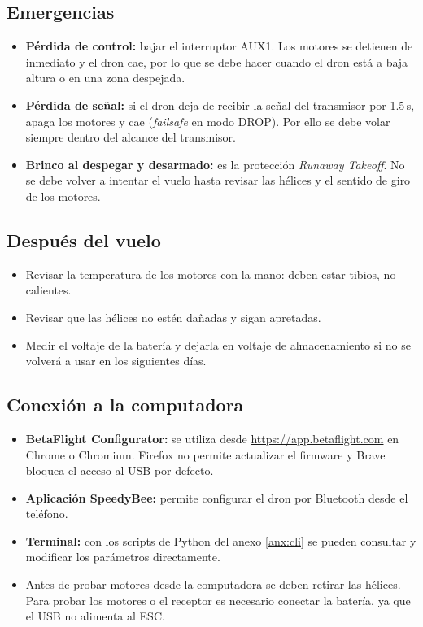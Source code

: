 \documentclass[11pt,letterpaper]{article}
\begin{document}
\subsection{Emergencias}
\begin{itemize}[nosep]
    \item \textbf{Pérdida de control:} bajar el interruptor AUX1. Los motores se detienen de inmediato y el dron cae, por lo que se debe hacer cuando el dron está a baja altura o en una zona despejada.
    \item \textbf{Pérdida de señal:} si el dron deja de recibir la señal del transmisor por 1.5\,s, apaga los motores y cae (\textit{failsafe} en modo DROP). Por ello se debe volar siempre dentro del alcance del transmisor.
    \item \textbf{Brinco al despegar y desarmado:} es la protección \textit{Runaway Takeoff}. No se debe volver a intentar el vuelo hasta revisar las hélices y el sentido de giro de los motores.
\end{itemize}

\subsection{Después del vuelo}
\begin{itemize}[nosep]
    \item Revisar la temperatura de los motores con la mano: deben estar tibios, no calientes.
    \item Revisar que las hélices no estén dañadas y sigan apretadas.
    \item Medir el voltaje de la batería y dejarla en voltaje de almacenamiento si no se volverá a usar en los siguientes días.
\end{itemize}

\subsection{Conexión a la computadora}
\begin{itemize}[nosep]
    \item \textbf{BetaFlight Configurator:} se utiliza desde \url{https://app.betaflight.com} en Chrome o Chromium. Firefox no permite actualizar el firmware y Brave bloquea el acceso al USB por defecto.
    \item \textbf{Aplicación SpeedyBee:} permite configurar el dron por Bluetooth desde el teléfono.
    \item \textbf{Terminal:} con los scripts de Python del anexo \ref{anx:cli} se pueden consultar y modificar los parámetros directamente.
    \item Antes de probar motores desde la computadora se deben retirar las hélices. Para probar los motores o el receptor es necesario conectar la batería, ya que el USB no alimenta al ESC.
\end{itemize}
\end{document}
